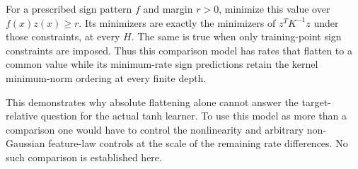 For a prescribed sign pattern $f$ and margin $r>0$, minimize this value
over $f(x)z(x)\ge r$. Its minimizers are exactly the minimizers of
$z^TK^{-1}z$ under those constraints, at every $H$. The same is true
when only training-point sign constraints are imposed. Thus this
comparison model has rates that flatten to a common value while its
minimum-rate sign predictions retain the kernel minimum-norm ordering
at every finite depth.

This demonstrates why absolute flattening alone cannot answer the
target-relative question for the actual tanh learner. To use this model
as more than a comparison one would have to control the nonlinearity
and arbitrary non-Gaussian feature-law controls at the scale of the
remaining rate differences. No such comparison is established here.
